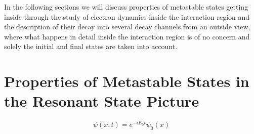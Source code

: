 In the following sections we will discuss properties of metastable states
getting inside through the study of electron dynamics inside the interaction
region
and the description of their decay into several decay channels from an outside
view, where what happens in detail inside the interaction region is of no
concern and solely the initial and final states are taken into account.

%
%
%




\section{Properties of Metastable States in the Resonant State Picture}

\begin{equation}
  \psi(x,t) = e^{-iE_0t} \psi_0(x)
\end{equation}


